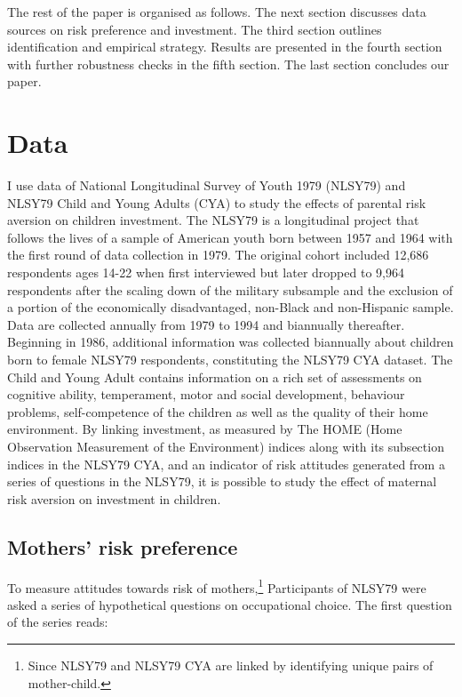 \documentclass[emulatestandardclasses, 10pt, abstract = true]{scrartcl}
\begin{document}
The rest of the paper is organised as follows. The next section discusses data sources on risk preference and investment. The third section outlines identification and empirical strategy. Results are presented in the fourth section with further robustness checks in the fifth section. The last section concludes our paper.



\section{Data}
I use data of National Longitudinal Survey of Youth 1979 (NLSY79) and NLSY79 Child and Young Adults (CYA) to study the effects of parental risk aversion on children investment. The NLSY79 is a longitudinal project that follows the lives of a sample of American youth born between 1957 and 1964 with the first round of data collection in 1979. The original cohort included 12,686 respondents ages 14-22 when first interviewed but later dropped to 9,964 respondents after the scaling down of the military subsample and the exclusion of a portion of the economically disadvantaged, non-Black and non-Hispanic sample. Data are collected annually from 1979 to 1994 and biannually thereafter. Beginning in 1986, additional information was collected biannually about children born to female NLSY79 respondents, constituting the NLSY79 CYA dataset. The Child and Young Adult contains information on a rich set of assessments on cognitive ability, temperament, motor and social development, behaviour problems, self-competence of the children as well as the quality of their home environment. By linking investment, as measured by The HOME (Home Observation Measurement of the Environment) indices along with its subsection indices in the NLSY79 CYA, and an indicator of risk attitudes generated from a series of questions in the NLSY79, it is possible to study the effect of maternal risk aversion on investment in children.

\subsection{Mothers' risk preference}
To measure attitudes towards risk of mothers,\footnote{Since NLSY79 and NLSY79 CYA are linked by identifying unique pairs of mother-child.} Participants of NLSY79 were asked a series of hypothetical questions on occupational choice. The first question of the series reads:
\end{document}
